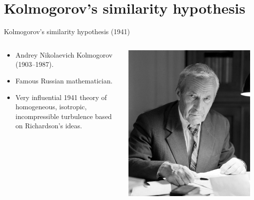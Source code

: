 \section{Kolmogorov's similarity hypothesis} %
\begin{frame}{Kolmogorov's similarity hypothesis (1941)}
  
\setlength{\fboxsep}{0pt}
\setlength{\fboxrule}{1pt}
\begin{columns}[T]
    \begin{column}{.58\textwidth}
    	\begin{itemize}
    		\item Andrey Nikolaevich Kolmogorov (1903--1987).
    		\item Famous Russian mathematician.
    		\item Very influential 1941 theory of homogeneous, isotropic, incompressible turbulence based on Richardson's ideas.
    	\end{itemize}	
    \end{column}
    \begin{column}{.42\textwidth}
    	\begin{minipage}[c][.5\textheight][c]{\linewidth}
    		\includegraphics[width=\textwidth]{kolmogorov.jpg}
    	\end{minipage}
    \end{column}
  \end{columns}
\end{frame}

